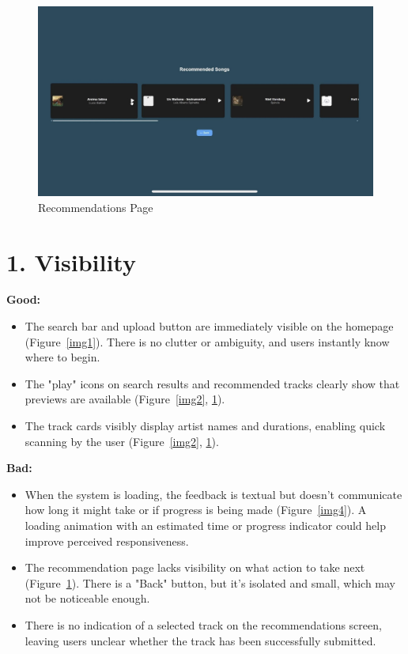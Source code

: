 \documentclass[12pt]{article}
\begin{document}
\begin{figure}[H]
    \centering
    \includegraphics[width=\textwidth]{normans_principles_figures/img5.jpg}
    \caption{Recommendations Page}
    \label{img5}
\end{figure}

\section*{1. Visibility}

\noindent\textbf{Good:}
\begin{itemize}
    \item The search bar and upload button are immediately visible on the homepage (Figure~\ref{img1}). There is no clutter or ambiguity, and users instantly know where to begin.
    \item The "play" icons on search results and recommended tracks clearly show that previews are available (Figure~\ref{img2}, \ref{img5}).
    \item The track cards visibly display artist names and durations, enabling quick scanning by the user (Figure~\ref{img2}, \ref{img5}).
\end{itemize}

\noindent\textbf{Bad:}
\begin{itemize}
    \item When the system is loading, the feedback is textual but doesn’t communicate how long it might take or if progress is being made (Figure~\ref{img4}). A loading animation with an estimated time or progress indicator could help improve perceived responsiveness.
    \item The recommendation page lacks visibility on what action to take next (Figure~\ref{img5}). There is a "Back" button, but it's isolated and small, which may not be noticeable enough.
    \item There is no indication of a selected track on the recommendations screen, leaving users unclear whether the track has been successfully submitted.
\end{itemize}
\end{document}
